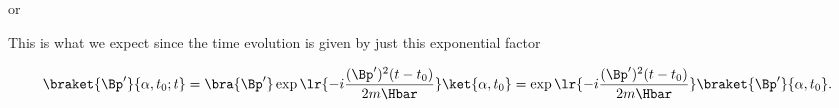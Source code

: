{or


This is what we expect since the time evolution is given by just this exponential factor

\begin{dmath}\label{eqn:freeParticlePropagator:220}
\braket{\Bp'}{\alpha, t_0 ; t}
= \bra{\Bp'} \exp\lr{ -i \frac{(\Bp')^2 (t -t_0)}{2 m \Hbar}} \ket{\alpha, t_0}
=
\exp\lr{ -i \frac{(\Bp')^2 (t -t_0)}{2 m \Hbar}}
\braket{\Bp'}
{\alpha, t_0}.
\end{dmath}

} %

